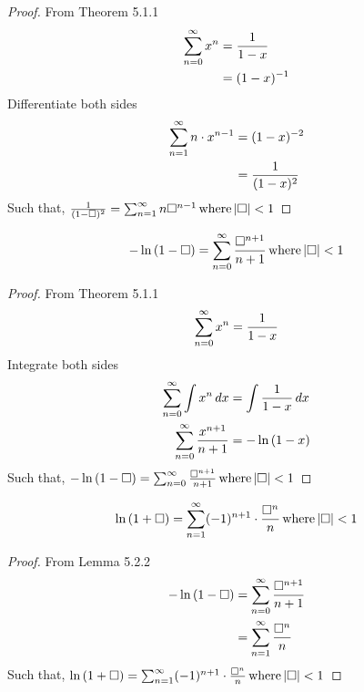 \begin{proof}
  From Theorem 5.1.1
  \begin{equation}
    \nonumber
    \begin{aligned}
      \sum_{n=0}^{\infty} x^n &= \frac{1}{1 - x} \\
      &= (1 - x)^{-1}
    \end{aligned}
  \end{equation}
  Differentiate both sides
  \begin{equation}
    \nonumber
    \begin{aligned}
      \sum_{n=1}^{\infty} n \cdot x^{n-1} &= (1-x)^{-2} \\
      &= \frac{1}{(1-x)^2}
    \end{aligned}
  \end{equation}
  Such that, \(\frac{1}{(1-\Box)^2} = \sum_{n=1}^{\infty} n \Box^{n-1} \, \mathrm{where} \, |\Box| < 1 \)
\end{proof}

\begin{lemma}
  \[
    - \ln{(1-\Box)} = \sum_{n=0}^{\infty} \frac{\Box^{n+1}}{n+1} \, \mathrm{where} \, |\Box| < 1
  \]
\end{lemma}

\begin{proof}
  From Theorem 5.1.1
  \begin{equation}
    \nonumber
    \begin{aligned}
      \sum_{n=0}^{\infty} x^{n} &= \frac{1}{1 - x} \\
    \end{aligned}
  \end{equation}
  Integrate both sides
  \begin{equation}
    \nonumber
    \begin{aligned}
      \sum_{n=0}^{\infty} \int x^n \, dx &= \int \frac{1}{1-x} \, dx \\
      \sum_{n=0}^{\infty} \frac{x^{n+1}}{n+1} &= - \ln{(1-x)} \\
    \end{aligned}
  \end{equation}
  Such that, \(- \ln{(1-\Box)} = \sum_{n=0}^{\infty} \frac{\Box^{n+1}}{n+1} \, \mathrm{where} \, |\Box| < 1 \)
\end{proof}

\begin{lemma}
  \[
    \ln{(1+\Box)} = \sum_{n=1}^{\infty} (-1)^{n+1} \cdot \frac{\Box^n}{n} \, \mathrm{where} \, |\Box| < 1
  \]
\end{lemma}

\begin{proof}
  From Lemma 5.2.2
  \begin{equation}
    \nonumber
    \begin{aligned}
      - \ln{(1-\Box)} &= \sum_{n=0}^{\infty} \frac{\Box^{n+1}}{n+1} \\
      &= \sum_{n=1}^{\infty} \frac{\Box^n}{n}
    \end{aligned}
  \end{equation}
  Such that, \(\ln{(1+\Box)} = \sum_{n=1}^{\infty} (-1)^{n+1} \cdot \frac{\Box^n}{n} \, \mathrm{where} \, |\Box| < 1 \)
\end{proof}
  
